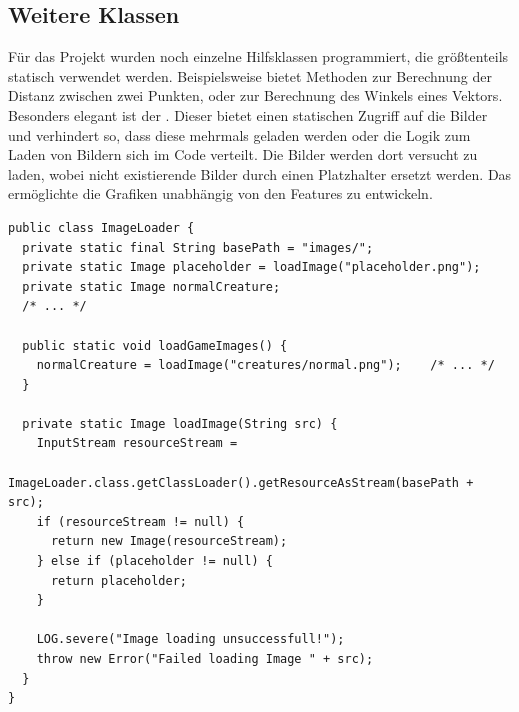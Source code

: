 \subsection{Weitere Klassen} %
\label{sub:weitere_klassen}
Für das Projekt wurden noch einzelne Hilfsklassen programmiert, die größtenteils statisch verwendet werden. Beispielsweise bietet  Methoden zur Berechnung der Distanz zwischen zwei Punkten, oder zur Berechnung des Winkels eines Vektors. Besonders elegant ist der . Dieser bietet einen statischen Zugriff auf die Bilder und verhindert so, dass diese mehrmals geladen werden oder die Logik zum Laden von Bildern sich im Code verteilt. Die Bilder werden dort versucht zu laden, wobei nicht existierende Bilder durch einen Platzhalter ersetzt werden. Das ermöglichte die Grafiken unabhängig von den Features zu entwickeln.
\begin{lstlisting}
public class ImageLoader {  
  private static final String basePath = "images/";
  private static Image placeholder = loadImage("placeholder.png");
  private static Image normalCreature;
  /* ... */

  public static void loadGameImages() {
    normalCreature = loadImage("creatures/normal.png");    /* ... */
  }

  private static Image loadImage(String src) {
    InputStream resourceStream =
        ImageLoader.class.getClassLoader().getResourceAsStream(basePath + src);
    if (resourceStream != null) {
      return new Image(resourceStream);
    } else if (placeholder != null) {
      return placeholder;
    }

    LOG.severe("Image loading unsuccessfull!");
    throw new Error("Failed loading Image " + src);
  }
}
\end{lstlisting}
